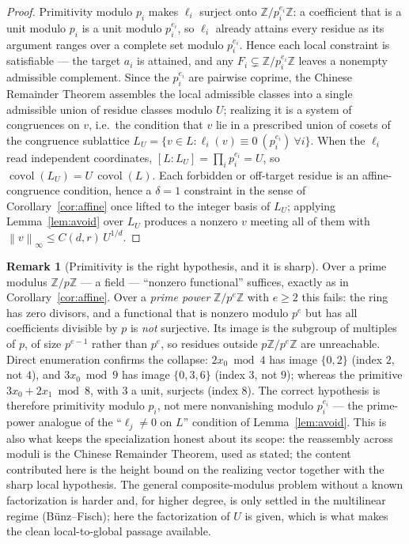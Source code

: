 \documentclass[11pt]{article}
\theoremstyle{definition}
\newtheorem{remark}{Remark}
\newcommand{\Z}{\mathbb{Z}}
\newcommand{\norm}[1]{\left\lVert #1 \right\rVert}
\DeclareMathOperator{\covol}{covol}
\begin{document}
\begin{proof}
Primitivity modulo $p_i$ makes $\ell_i$ surject onto $\Z/p_i^{e_i}\Z$: a coefficient
that is a unit modulo $p_i$ is a unit modulo $p_i^{e_i}$, so $\ell_i$ already attains
every residue as its argument ranges over a complete set modulo $p_i^{e_i}$. Hence each
local constraint is satisfiable --- the target $a_i$ is attained, and any $F_i \subsetneq
\Z/p_i^{e_i}\Z$ leaves a nonempty admissible complement. Since the $p_i^{e_i}$ are
pairwise coprime, the Chinese Remainder Theorem assembles the local admissible classes
into a single admissible union of residue classes modulo $U$; realizing it is a system
of congruences on $v$, i.e.\ the condition that $v$ lie in a prescribed union of cosets
of the congruence sublattice $L_U = \{v \in L : \ell_i(v) \equiv 0 \ (p_i^{e_i})\
\forall i\}$. When the $\ell_i$ read independent coordinates, $[L : L_U] = \prod_i
p_i^{e_i} = U$, so $\covol(L_U) = U\,\covol(L)$. Each forbidden or off-target residue is
an affine-congruence condition, hence a $\delta=1$ constraint in the sense of
Corollary~\ref{cor:affine} once lifted to the integer basis of $L_U$; applying
Lemma~\ref{lem:avoid} over $L_U$ produces a nonzero $v$ meeting all of them with
$\norm{v}_\infty \le C(d,r)\,U^{1/d}$.
\end{proof}

\begin{remark}[Primitivity is the right hypothesis, and it is sharp]\label{rem:primitive}
Over a prime modulus $\Z/p\Z$ --- a field --- ``nonzero functional'' suffices, exactly
as in Corollary~\ref{cor:affine}. Over a \emph{prime power} $\Z/p^e\Z$ with $e \ge 2$
this fails: the ring has zero divisors, and a functional that is nonzero modulo $p^e$
but has all coefficients divisible by $p$ is \emph{not} surjective. Its image is the
subgroup of multiples of $p$, of size $p^{e-1}$ rather than $p^e$, so residues outside
$p\Z/p^e\Z$ are unreachable. Direct enumeration confirms the collapse: $2x_0 \bmod 4$
has image $\{0,2\}$ (index $2$, not $4$), and $3x_0 \bmod 9$ has image $\{0,3,6\}$
(index $3$, not $9$); whereas the primitive $3x_0 + 2x_1 \bmod 8$, with $3$ a unit,
surjects (index $8$). The correct hypothesis is therefore primitivity modulo $p_i$, not
mere nonvanishing modulo $p_i^{e_i}$ --- the prime-power analogue of the ``$\ell_j \ne
0$ on $L$'' condition of Lemma~\ref{lem:avoid}. This is also what keeps the specialization
honest about its scope: the reassembly across moduli is the Chinese Remainder Theorem,
used as stated; the content contributed here is the height bound on the realizing vector
together with the sharp local hypothesis. The general composite-modulus problem without
a known factorization is harder and, for higher degree, is only settled in the
multilinear regime (B\"unz--Fisch); here the factorization of $U$ is given, which is
what makes the clean local-to-global passage available.
\end{remark}
\end{document}

